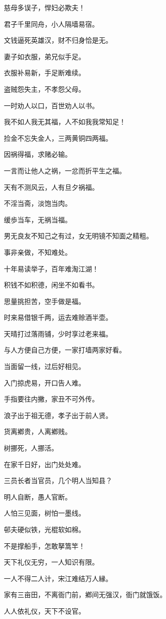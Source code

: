 \documentclass[12pt,oneside]{book}
\begin{document}
慈母多误子，悍妇必欺夫！

君子千里同舟，小人隔墙易宿。

文钱逼死英雄汉，财不归身恰是无。

妻子如衣服，弟兄似手足。

衣服补易新，手足断难续。

盗贼怨失主，不孝怨父母。

一时劝人以口，百世劝人以书。

我不如人我无其福，人不如我我常知足！

捡金不忘失金人，三两黄铜四两福。

因祸得福，求赌必输。

一言而让他人之祸，一忿而折平生之福。

天有不测风云，人有旦夕祸福。

不淫当斋，淡饱当肉。

缓歩当车，无祸当福。

男无良友不知己之有过，女无明镜不知面之精粗。

事非亲做，不知难处。

十年易读举子，百年难淘江湖！

积钱不如积德，闲坐不如看书。

思量挑担苦，空手做是福。

时来易借银千两，运去难赊酒半壶。

天晴打过落雨铺，少时享过老来福。

与人方便自己方便，一家打墙两家好看。

当面留一线，过后好相见。

入门掠虎易，开口告人难。

手指要往内撇，家丑不可外传。

浪子出于祖无德，孝子出于前人贤。

货离鄕贵，人离鄕贱。

树挪死，人挪活。

在家千日好，出门处处难。

三员长者当官员，几个明人当知县？

明人自断，愚人官断。

人怕三见面，树怕一墨线。

邨夫硬似铁，光棍软如棉。

不是撑船手，怎敢拏篙竿！

天下礼仪无穷，一人知识有限。

一人不得二人计，宋江难结万人縁。

家有三亩田，不离衙门前，鄕间无强汉，衙门就饿饭。

人人依礼仪，天下不设官。
\end{document}
